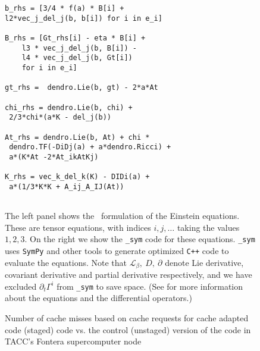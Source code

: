 \documentclass[sigconf,]{acmart}
\begin{document}
\begin{figure*}[t]
\begin{minipage}[t]{.52\textwidth}
\begin{verbatim}
b_rhs = [3/4 * f(a) * B[i] + 
l2*vec_j_del_j(b, b[i]) for i in e_i]
		
B_rhs = [Gt_rhs[i] - eta * B[i] + 
	l3 * vec_j_del_j(b, B[i]) - 
	l4 * vec_j_del_j(b, Gt[i]) 
	for i in e_i]
		
gt_rhs =  dendro.Lie(b, gt) - 2*a*At

chi_rhs = dendro.Lie(b, chi) + 
 2/3*chi*(a*K - del_j(b)) 
		
At_rhs = dendro.Lie(b, At) + chi *
 dendro.TF(-DiDj(a) + a*dendro.Ricci) +
 a*(K*At -2*At_ikAtKj)
		
K_rhs = vec_k_del_k(K) - DIDi(a) +
 a*(1/3*K*K + A_ij_A_IJ(At)) 
		
\end{verbatim}
	\end{minipage}
	\caption{\label{fig:symb} The left panel shows the \BSSN ~formulation of the 
		Einstein equations. These are tensor equations, with indices $i,j,\ldots$
		taking the values $1, 2, 3$. On the right we show the \texttt{{\dendro\_sym}}
		code for these equations. \texttt{\dendro\_sym} uses \texttt{SymPy} and other tools
		to generate optimized \texttt{C++} code to evaluate the equations. Note that $\mathcal{L}_\beta,\ D,\ \partial$ denote Lie derivative, covariant derivative and partial derivative respectively, and we have excluded $\partial_t\Gamma^i$ from \texttt{\dendro\_sym} to save space. (See \cite{Baumgarte:1998te,Alcubierre:1138167} for more information about the equations and the differential operators.)}
	\label{fig:bssneqs}
	\vspace{-0.15in}
\end{figure*}

\begin{figure}
  \centering
    \caption{Number of cache misses based on cache requests for cache adapted code (staged) code vs. the control (unstaged) version of the code in TACC's Fontera supercomputer node }
    \label{fig:cache_results}
  \end{figure}
  
\end{document}
